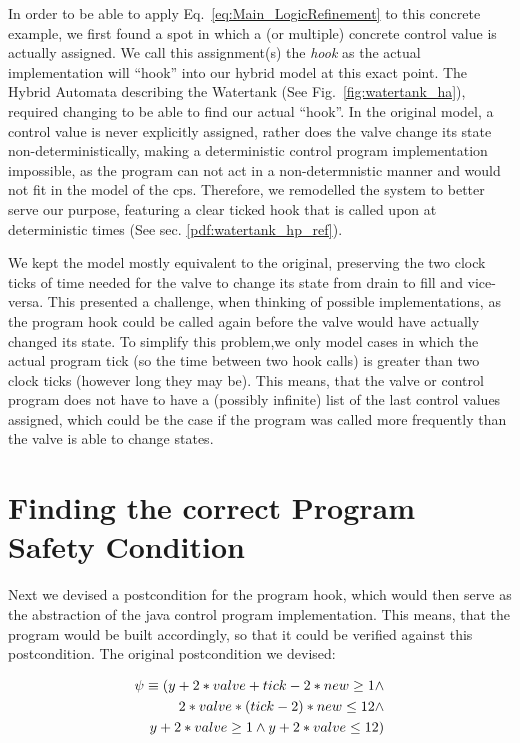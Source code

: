 In order to be able to apply Eq.~\ref{eq:Main_LogicRefinement} to this concrete example, we first found a spot in which a (or multiple) concrete control value is actually assigned. We call this assignment(s) the \textit{hook} as the actual implementation will ``hook'' into our hybrid model at this exact point. The Hybrid Automata describing the Watertank (See Fig.~\ref{fig:watertank_ha}), required changing to be able to find our actual ``hook''. In the original model, a control value is never explicitly assigned, rather does the valve change its state non-deterministically, making a deterministic control program implementation impossible, as the program can not act in a non-determnistic manner and would not fit in the model of the cps. Therefore, we remodelled the system to better serve our purpose, featuring a clear ticked hook that is called upon at deterministic times (See sec. \ref{pdf:watertank_hp_ref}).

\label{pdf:watertank_hp_ref}


We kept the model mostly equivalent to the original, preserving the two clock ticks of time needed for the valve to change its state from drain to fill and vice-versa. This presented a challenge, when thinking of possible implementations, as the program hook could be called again before the valve would have actually changed its state. To simplify this problem,we only model cases in which the actual program tick (so the time between two hook calls)  is greater than two clock ticks (however long they may be).  This means, that the valve or control program does not have to have a (possibly infinite) list of the last control values assigned, which could be the case if the program was called more frequently than the valve is able to change states.

\section{Finding the correct Program Safety Condition}
\label{sec:Watertank:SafetyCond}

Next we devised a postcondition for the program hook, which would then serve as the abstraction of the java control program implementation. This means, that the program would be built accordingly, so that it could be verified against this postcondition. The original postcondition we devised:

\begin{equation}
	\centering
	\begin{split}
		\psi \equiv (y + 2* valve + tick -2 * new  \geq 1 \wedge \\ 2 * valve * (tick - 2) * new \leq 12 \wedge \\  y + 2* valve \geq 1 \wedge  y + 2 * valve \leq 12) 
	\end{split}
\label{eq:postCondOrig}
\end{equation}

